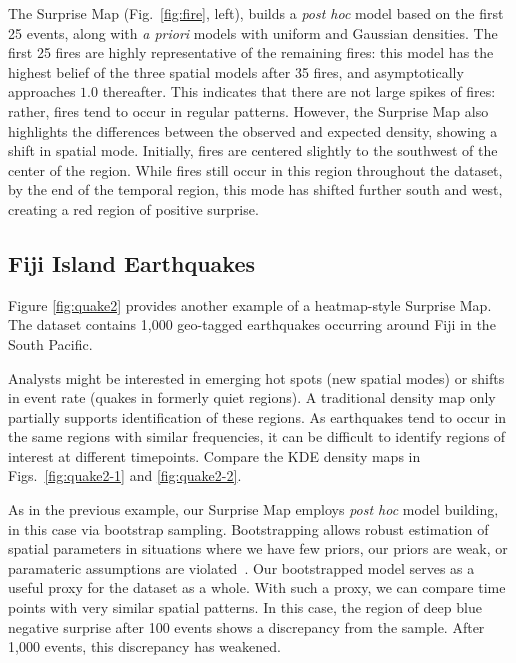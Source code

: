 \documentclass[journal]{vgtc}                %
\begin{document}
The Surprise Map (Fig.~\ref{fig:fire}, left), builds a \emph{post hoc} model based on the first 25 events, along with \emph{a priori} models with uniform and Gaussian densities. The first 25 fires are highly representative of the remaining fires: this model has the highest belief of the three spatial models after 35 fires, and asymptotically approaches $1.0$ thereafter. This indicates that there are not large spikes of fires: rather, fires tend to occur in regular patterns. However, the Surprise Map also highlights the differences between the observed and expected density, showing a shift in spatial mode. Initially, fires are centered slightly to the southwest of the center of the region. While fires still occur in this region throughout the dataset, by the end of the temporal region, this mode has shifted further south and west, creating a red region of positive surprise.

\subsection{Fiji Island Earthquakes}

\quakeFigvTwo

Figure \ref{fig:quake2} provides another example of a heatmap-style Surprise Map. The dataset contains 1,000 geo-tagged earthquakes occurring around Fiji in the South Pacific.

Analysts might be interested in emerging hot spots (new spatial modes) or shifts in event rate (quakes in formerly quiet regions). A traditional density map only partially supports identification of these regions. As earthquakes tend to occur in the same regions with similar frequencies, it can be difficult to identify regions of interest at different timepoints. Compare the KDE density maps in Figs.~\ref{fig:quake2-1} and \ref{fig:quake2-2}.

As in the previous example, our Surprise Map employs \emph{post hoc} model building, in this case via bootstrap sampling. Bootstrapping allows robust estimation of spatial parameters in situations where we have few priors, our priors are weak, or paramateric assumptions are violated~\cite{fasso2007general,pinkse1998contracting}. Our bootstrapped model serves as a useful proxy for the dataset as a whole. With such a proxy, we can compare time points with very similar spatial patterns. In this case, the region of deep blue negative surprise after 100 events shows a discrepancy from the sample. After 1,000 events, this discrepancy has weakened.
\end{document}

